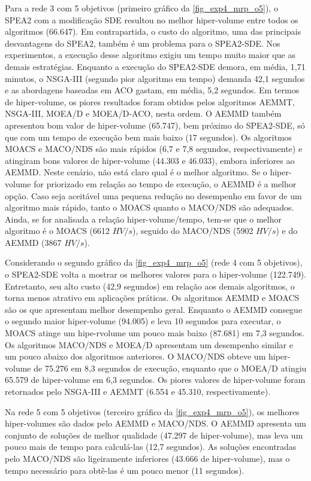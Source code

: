 Para a rede 3 com 5 objetivos (primeiro gráfico da \autoref{fig_exp4_mrp_o5}), o SPEA2 com a modificação SDE resultou no melhor hiper-volume entre todos os algoritmos (66.647). Em contrapartida, o custo do algoritmo, uma das principais desvantagens do SPEA2, também é um problema para o SPEA2-SDE. Nos experimentos, a execução desse algoritmo exigiu um tempo muito maior que as demais estratégias. Enquanto a execução do SPEA2-SDE demora, em média, 1,71 minutos, o NSGA-III (segundo pior algoritmo em tempo) demanda 42,1 segundos e as abordagens baseadas em ACO gastam, em média, 5,2 segundos. Em termos de hiper-volume, os piores resultados foram obtidos pelos algoritmos AEMMT, NSGA-III, MOEA/D e MOEA/D-ACO, nesta ordem. O AEMMD também apresentou bom valor de hiper-volume (65.747), bem próximo do SPEA2-SDE, só que com um tempo de execução bem mais baixo (17 segundos). Os algoritmos MOACS e MACO/NDS são mais rápidos (6,7 e 7,8 segundos, respectivamente) e atingiram bons valores de hiper-volume (44.303 e 46.033), embora inferiores ao AEMMD. Neste cenário, não está claro qual é o melhor algoritmo. Se o hiper-volume for priorizado em relação ao tempo de execução, o AEMMD é a melhor opção. Caso seja aceitável uma pequena redução no desempenho em favor de um algoritmo mais rápido, tanto o MOACS quanto o MACO/NDS são adequados. Ainda, se for analisada a relação hiper-volume/tempo, tem-se que o melhor algoritmo é o MOACS (6612 $HV/s$), seguido do MACO/NDS (5902 $HV/s$) e do AEMMD (3867 $HV/s$).

Considerando o segundo gráfico da \autoref{fig_exp4_mrp_o5} (rede 4 com 5 objetivos), o SPEA2-SDE volta a mostrar os melhores valores para o hiper-volume (122.749). Entretanto, seu alto custo (42,9 segundos) em relação aos demais algoritmos, o torna menos atrativo em aplicações práticas. Os algoritmos AEMMD e MOACS são os que apresentam melhor desempenho geral. Enquanto o AEMMD consegue o segundo maior hiper-volume (94.005) e leva 10 segundos para executar, o MOACS atinge um hipe-rvolume um pouco mais baixo (87.681) em 7,3 segundos. Os algoritmos MACO/NDS e MOEA/D apresentam um desempenho similar e um pouco abaixo dos algoritmos anteriores. O MACO/NDS obteve um hiper-volume de 75.276 em 8,3 segundos de execução, enquanto que o MOEA/D atingiu 65.579 de hiper-volume em 6,3 segundos. Os piores valores de hiper-volume foram retornados pelo NSGA-III e AEMMT (6.554 e 45.310, respectivamente).

Na rede 5 com 5 objetivos (terceiro gráfico da \autoref{fig_exp4_mrp_o5}), os melhores hiper-volumes são dados pelo AEMMD e MACO/NDS. O AEMMD apresenta um conjunto de soluções de melhor qualidade (47.297 de hiper-volume), mas leva um pouco mais de tempo para calculá-las (12,7 segundos). As soluções encontradas pelo MACO/NDS são ligeiramente inferiores (43.666 de hiper-volume), mas o tempo necessário para obtê-las é um pouco menor (11 segundos).

